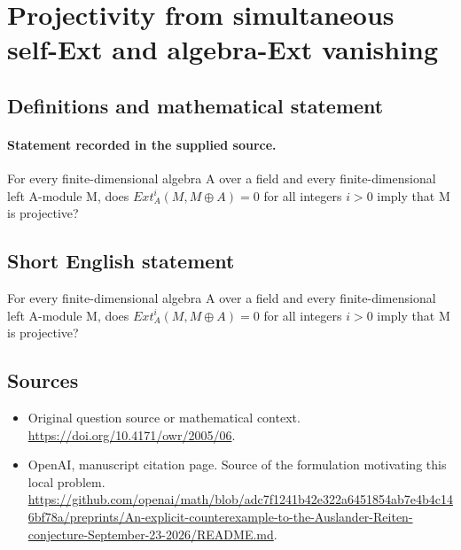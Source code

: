 \documentclass[11pt]{article}
\begin{document}
\section*{Projectivity from simultaneous self-Ext and algebra-Ext vanishing}\label{statement}
\subsection{Definitions and mathematical statement}
\paragraph{Statement recorded in the supplied source.}
For every finite-dimensional algebra A over a field and every finite-dimensional left A-module M, does $Ext_A^i(M,M\oplus A)=0$ for all integers $i>0$ imply that M is projective?
\subsection{Short English statement}
For every finite-dimensional algebra A over a field and every finite-dimensional left A-module M, does $Ext_A^i(M,M\oplus A)=0$ for all integers $i>0$ imply that M is projective?
\subsection{Sources}
\begin{itemize}
\item[S1] Original question source or mathematical context.
\url{https://doi.org/10.4171/owr/2005/06}.
\item[S2] OpenAI, manuscript citation page. Source of the formulation motivating this local problem.
\url{https://github.com/openai/math/blob/adc7f1241b42e322a6451854ab7e4b4c146bf78a/preprints/An-explicit-counterexample-to-the-Auslander-Reiten-conjecture-September-23-2026/README.md}.
\end{itemize}
\end{document}
